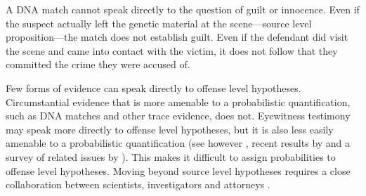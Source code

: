 \documentclass{article}
\begin{document}
A DNA match cannot speak directly to the question of guilt or innocence.  
Even if the suspect actually left the genetic material at the scene---source level proposition---the match does not establish guilt. %
Even if the defendant did visit the scene and came into contact with the victim, it does not follow that they committed the crime they were accused of. 

Few forms of evidence can speak directly to offense level hypotheses. Circumstantial evidence that is more amenable to a probabilistic quantification, such as DNA matches and other trace evidence, does not. 
Eyewitness testimony may speak more directly to offense level hypotheses, but it is also less easily amenable to a probabilistic quantification (see however \citealp{Friedman1987Route-Analysys-}, recent results by \citealp{wixted2017RelationshipEyewitnessConfidence}
 and a survey of related issues by \citealp{Urbaniak2020Decision}).
This makes it  difficult to assign probabilities to offense level hypotheses. %
Moving beyond source level hypotheses requires a close collaboration  between scientists, investigators and attorneys \citep[see][for a discussion]{Cook1998hierarchy}. 
\end{document}
